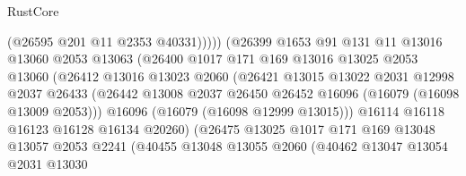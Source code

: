 \begin{lexlean}{RustCore}
\begin{coremodule}
                                    (@26595 @201 @11 @2353 @40331)))))
                            (@26399
                              @1653
                              @91
                              @131
                              @11
                              @13016
                              @13060
                              @2053
                              @13063
                              (@26400
                                @1017
                                @171
                                @169
                                @13016
                                @13025
                                @2053
                                @13060
                                (@26412
                                  @13016
                                  @13023
                                  @2060
                                  (@26421
                                    @13015
                                    @13022
                                    @2031
                                    @12998
                                    @2037
                                    @26433
                                    (@26442
                                      @13008
                                      @2037
                                      @26450
                                      @26452
                                      @16096
                                      (@16079 (@16098 @13009 @2053)))
                                    @16096
                                    (@16079 (@16098 @12999 @13015)))
                                  @16114
                                  @16118
                                  @16123
                                  @16128
                                  @16134
                                  @20260)
                                (@26475
                                  @13025
                                  @1017
                                  @171
                                  @169
                                  @13048
                                  @13057
                                  @2053
                                  @2241
                                  (@40455
                                    @13048
                                    @13055
                                    @2060
                                    (@40462
                                      @13047
                                      @13054
                                      @2031
                                      @13030

\end{coremodule}
\end{lexlean}
